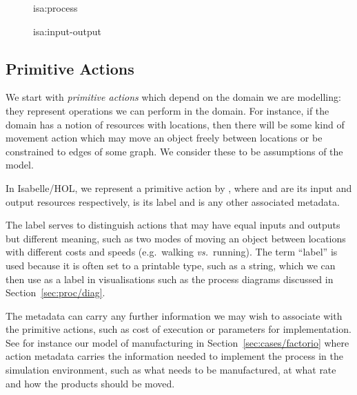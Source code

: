 \documentclass[class=smolathesis,crop=false]{standalone}
\begin{document}
\begin{figure}[p]
  \begin{isadefraw}{isa:process}
    
  \end{isadefraw}
\end{figure}

\begin{figure}[p]
  \begin{isadefraw}{isa:input-output}
    
  \end{isadefraw}
\end{figure}

\subsection{Primitive Actions}
\label{sec:proc/type/primitive}

We start with \emph{primitive actions} which depend on the domain we are modelling: they represent operations we can perform in the domain.
For instance, if the domain has a notion of resources with locations, then there will be some kind of movement action which may move an object freely between locations or be constrained to edges of some graph.
We consider these to be assumptions of the model.

In Isabelle/HOL, we represent a primitive action by , where  and  are its input and output resources respectively,  is its label and  is any other associated metadata.

The label serves to distinguish actions that may have equal inputs and outputs but different meaning, such as two modes of moving an object between locations with different costs and speeds (e.g.\ walking \emph{vs.}\ running).
The term ``label'' is used because it is often set to a printable type, such as a string, which we can then use as a label in visualisations such as the process diagrams discussed in Section~\ref{sec:proc/diag}.

The metadata can carry any further information we may wish to associate with the primitive actions, such as cost of execution or parameters for implementation.
See for instance our model of manufacturing in Section~\ref{sec:cases/factorio} where action metadata carries the information needed to implement the process in the simulation environment, such as what needs to be manufactured, at what rate and how the products should be moved.
\end{document}
